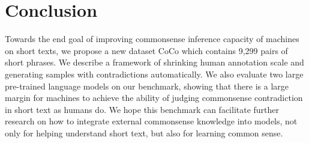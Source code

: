 \section{Conclusion}
Towards the end goal of improving commonsense inference capacity of machines on short texts, 
we propose a new dataset CoCo which contains 9,299 pairs of short phrases. 
We describe a framework of shrinking human annotation scale and generating samples with contradictions automatically. 
We also evaluate two large pre-trained language models on our benchmark, 
showing that there is a large margin for machines to achieve the ability of judging commonsense contradiction in short text as humans do. 
We hope this benchmark can facilitate further research on how to integrate external commonsense knowledge into models, not only for helping understand short text, but also for learning common sense.